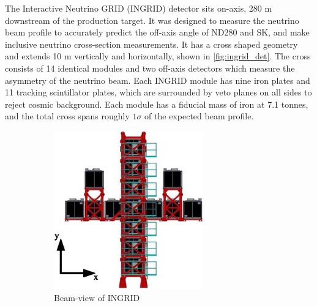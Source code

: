 The Interactive Neutrino GRID (INGRID) detector sits on-axis, 280 m downstream of the production target. It was designed to measure the neutrino beam profile to accurately predict the off-axis angle of ND280 and SK, and make inclusive neutrino cross-section measurements\cite{t2k_ingrid_xsec}. It has a cross shaped geometry and extends 10 m vertically and horizontally, shown in \autoref{fig:ingrid_det}. The cross consists of 14 identical modules and two off-axis detectors which measure the asymmetry of the neutrino beam. Each INGRID module has nine iron plates and 11 tracking scintillator plates, which are surrounded by veto planes on all sides to reject cosmic background\cite{t2k_ingrid}. Each module has a fiducial mass of iron at 7.1 tonnes, and the total cross spans roughly $1\sigma$ of the expected beam profile.
\begin{figure}[h]
	\begin{subfigure}[t]{0.47\textwidth}
		\includegraphics[width=\textwidth, trim={0mm 0mm 0mm 0mm}, clip,page=1]{figures/det_chap/ingrid/ingrid}
		\caption{Beam-view of INGRID}
	\end{subfigure}	
	\begin{subfigure}[t]{0.47\textwidth}

\end{subfigure}
\end{figure}
